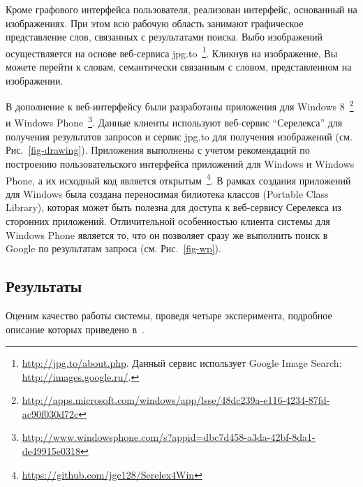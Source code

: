 \documentclass[a4paper,10pt,twoside]{article}
\begin{document}

Кроме графового интерфейса пользователя, реализован интерфейс, основанный на изображениях. При этом всю рабочую область занимают графическое представление слов, связанных с результатами поиска. Выбо изображений осуществляется на основе веб-сервиса jpg.to~\footnote{\url{http://jpg.to/about.php}. Данный сервис использует Google Image Search: \url{http://images.google.ru/}.}. Кликнув на изображение, Вы можете перейти к словам, семантически связанным с словом, представленном на изображении.


В дополнение к веб-интерфейсу были разработаны приложения для Windows 8~\footnote{\url{http://apps.microsoft.com/windows/app/lsse/48dc239a-e116-4234-87fd-ac90f030d72c}} и Windows Phone~\footnote{\url{http://www.windowsphone.com/s?appid=dbc7d458-a3da-42bf-8da1-de49915e0318}}. Данные клиенты используют веб-сервис "`Серелекса"' для получения результатов запросов и сервис jpg.to для получения изображений (см. Рис.~\ref{fig-drawing}). Приложения выполнены с учетом рекомендаций по построению пользовательского интерфейса приложений для Windows и Windows Phone, а их исходный код является открытым~\footnote{\url{https://github.com/jgc128/Serelex4Win}}. В рамках создания приложений для Windows была создана переносимая билиотека классов (Portable Class Library), которая может быть полезна для доступа к веб-сервису Серелекса из сторонних приложений. Отличительной особенностью клиента системы для Windows Phone является то, что он позволяет сразу же выполнить поиск в Google по результатам запроса (см. Рис.~\ref{fig-wp}).



\subsection{Результаты}
Оценим качество работы системы, проведя четыре эксперимента, подробное описание которых приведено в~\cite{panchenko2012konvens}.  
\end{document}
